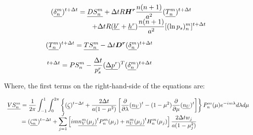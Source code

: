 \documentclass[12pt,a4paper]{book}
\begin{document}
	\begin{equation}
	\begin{array}{l}
	\displaystyle 
	(\underline{\delta_n^m})^{t+\Delta t} = \underline{DS_n^m} 
	+ \Delta t R \boldsymbol{H^r} \frac{n(n+1)}{a^2} (\underline{T_n^m})^{t+\Delta t} \\
	\displaystyle 
	\hspace{5 pc} + \Delta t R (\underline{b^r} + \underline{h^r}) \frac{n(n+1)}{a^2} [ (\ln p_s)_n^m ] ^{t+\Delta t} 	
	\end{array} 
	\end{equation}

	\begin{equation}
	(\underline{T_n^m})^{t+\Delta t} = \underline{TS_n^m} 
	- \Delta t \boldsymbol{D^r} (\underline{\delta_n^m})^{t+\Delta t}   \hspace{7 pc}
	\end{equation}

	\begin{equation}
	[ (\ln p_s)_n^m ] ^{t+\Delta t} = PS_n^m 
	- \frac{\Delta t}{p_s^r} (\underline{\Delta p^r})^T (\underline{\delta_n^m})^{t+\Delta t}   \hspace{7 pc}
	\end{equation}

Where, the first terms on the right-hand-side of the equations are:

	\begin{equation}
	\begin{array}{l}
	\displaystyle 
	\underline{VS_n^m} =  \frac{1}{2\pi} \int_{-1}^{1} \int_{0}^{2 \pi} \left\lbrace
		(\underline{\zeta})^{t-\Delta t} 
		+ \frac{2\Delta t }{a(1-\mu^2)} \left[ \frac{\partial}{\partial \lambda} (\underline{n_V})^t 
		- (1-\mu^2) \frac{\partial}{\partial \mu} (\underline{n_U})^t \right] \right\rbrace
	P_n^m(\mu) e^{-im\lambda} d\lambda d\mu \\
	\displaystyle 
	\hspace{2 pc} = (\underline{\zeta_n^m})^{t-\Delta t}  + \sum_{j=1}^{J} \left[ 
		 im \underline{n_V^m(\mu_j)}^t P_n^m(\mu_j) 
		+   \underline{n_U^m(\mu_j)}^t H_n^m(\mu_j) 
		\right] \frac{2 \Delta t w_j}{a(1-\mu_j^2)}
	\end{array} 
	\end{equation}
	
\end{document}
